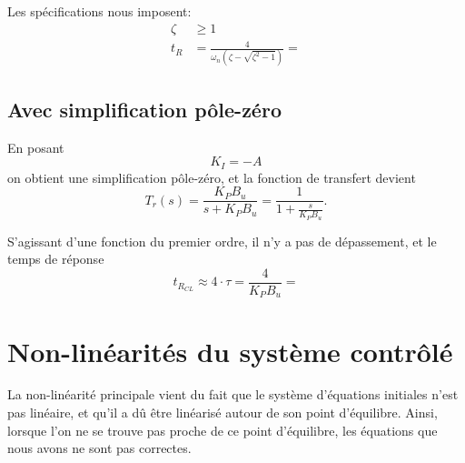 \documentclass[frenchb, paper=a4, fontsize=11pt]{scrartcl}
\numberwithin{equation}{section}					%
\numberwithin{figure}{section}					%
\numberwithin{table}{section}						%
\begin{document}
Les spécifications nous imposent:
\begin{align}
\zeta &\ge 1\\
t_R & = \frac{4}{\omega_n(\zeta - \sqrt{\zeta^2-1})} = 
\end{align}


\subsection{Avec simplification pôle-zéro}
En posant 
\begin{equation}
K_I = -A
\end{equation}
on obtient une simplification pôle-zéro, et la fonction de transfert devient
\begin{equation}
T_r(s) = \frac{K_P B_u}{s+K_P B_u}= \frac{1}{1+\frac{s}{K_P B_u}}.
\end{equation}

S'agissant d'une fonction du premier ordre, il n'y a pas de dépassement, et le temps de réponse
\begin{equation}
t_{R_{CL}} \approx 4\cdot \tau = \frac{4}{K_P B_u} = 
\end{equation}

\section{Non-linéarités du système contrôlé}
La non-linéarité principale vient du fait que le système d'équations initiales n'est pas linéaire, et qu'il a dû être linéarisé autour de son point d'équilibre. Ainsi, lorsque l'on ne se trouve pas proche de ce point d'équilibre, les équations que nous avons ne sont pas correctes.
\end{document}
